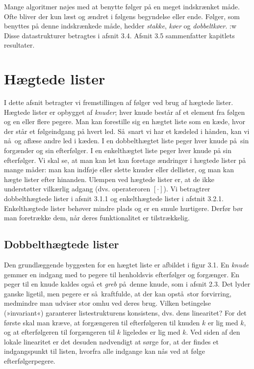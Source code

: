Mange algoritmer nøjes med at benytte følger på en meget indskrænket måde.
Ofte bliver der kun læst og ændret i følgens begyndelse eller ende.
Følger, som benyttes på denne indskrænkede måde, hedder \emph{stakke}, \emph{køer} og \emph{dobbeltkøer}.
:w
Disse datastrukturer betragtes i afsnit 3.4.
Afsnit 3.5 sammenfatter kapitlets resultater.

\section{Hægtede lister}


\newcommand{\friListe}{\varname{friListe}}

I dette afsnit betragter vi fremstillingen af følger ved brug af hægtede lister.
Hægtede lister er opbygget af \emph{knuder}; hver knude består af et element fra følgen og en eller flere pegere.
Man kan forestille sig en hægtet liste som en kæde, hvor der står et følgeindgang på hvert led.
Så snart vi har et kædeled i hånden, kan vi nå og aflæse andre led i kæden.
I en dobbelthægtet liste peger hver knude på sin forgænder og sin efterfølger.
I en enkelthægtet liste peger hver knude på sin efterfølger.
Vi skal se, at man kan let kan foretage ændringer i  hægtede lister på mange måder:
man kan indføje eller slette knuder eller dellister, og man kan hægte lister efter hinanden.
Ulempen ved hægtede lister er, at de ikke understøtter vilkærlig adgang (dvs. operateroren $[\cdot]$).
Vi betragtrer dobbelthægtede lister i afsnit 3.1.1 og enkelthægtede lister i afstnit 3.2.1.
Enkelthægtede lister behøver mindre plads og er en smule hurtigere.
Derfør bør man foretrække dem, når deres funktionalitet er tilstrækkelig.

\subsection{Dobbelthægtede lister}

Den grundlæggende byggesten for en hægtet liste er afbildet i figur 3.1.
En \emph{knude} gemmer en indgang med to pegere til henholdsvis efterfølger og forgænger.
En peger til en knude kaldes også et \emph{greb} på denne knude, som i afsnit 2.3.
Det lyder ganske ligetil, men pegere er så kraftfulde, at der kan opstå stor forvirring, medmindre man udviser stor omhu ved deres brug.
Vilken betingelse (»invariant«) garanterer listestrukturens konsistens, dvs. dens linearitet?
For det første skal man kræve, at forgængeren til efterfølgeren til knuden $k$ er lig med $k$, og at efterfølgeren til forgængeren til $k$ ligeledes er lig med $k$.
Ved siden af den lokale linearitet er det desuden nødvendigt at sørge for, at der findes et indgangspunkt til listen, hvorfra alle indgange kan nås ved at følge efterfølgerpegere.


